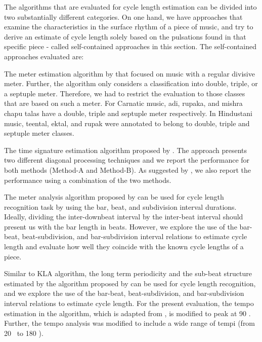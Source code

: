 The algorithms that are evaluated for cycle length estimation can be divided into two substantially different categories. On one hand, we have approaches that examine the characteristics in the surface rhythm of a piece of music, and try to derive an estimate of cycle length solely based on the pulsations found in that specific piece - called self-contained approaches in this section. The self-contained approaches evaluated are:
\begin{description}[leftmargin=*]
	\item[\acrshort{GUL} algorithm:]The meter estimation algorithm by  that focused on music with a regular divisive meter. Further, the algorithm only considers a classification into double, triple, or a septuple meter. Therefore, we had to restrict the evaluation to those classes that are based on such a meter. For Carnatic music, \gls{adi}, \gls{rupaka}, and \gls{mishra chapu} \glspl{tala} have a double, triple and septuple meter respectively. In Hindustani music, \gls{teental}, \gls{ektal}, and \gls{rupak} were annotated to belong to double, triple and septuple meter classes. 
	\item[\acrshort{PIK} algorithm:]The time signature estimation algorithm proposed by . The approach presents two different diagonal processing techniques and we report the performance for both methods (Method-A and Method-B). As suggested by \citeauthor{pikrakis:04:meter}, we also report the performance using a combination of the two methods. 
	\item[\acrshort{KLA} algorithm:]The meter analysis algorithm proposed by  can be used for cycle length recognition task by using the bar, beat, and subdivision interval durations. Ideally, dividing the inter-downbeat interval by the inter-beat interval should present us with the bar length in beats. However, we explore the use of the bar-beat, beat-subdivision, and bar-subdivision interval relations to estimate cycle length and evaluate how well they coincide with the known cycle lengths of a piece. 
	\item[\acrshort{SRI} algorithm:]Similar to \acrshort{KLA} algorithm, the long term periodicity and the sub-beat structure estimated by the algorithm proposed by  can be used for cycle length recognition, and we explore the use of the bar-beat, beat-subdivision, and bar-subdivision interval relations to estimate cycle length. For the present evaluation, the tempo estimation in the algorithm, which is adapted from , is modified to peak at 90 \bpm. Further, the tempo analysis was modified to include a wide range of tempi (from 20 \bpm\ to 180 \bpm). 
\end{description}
